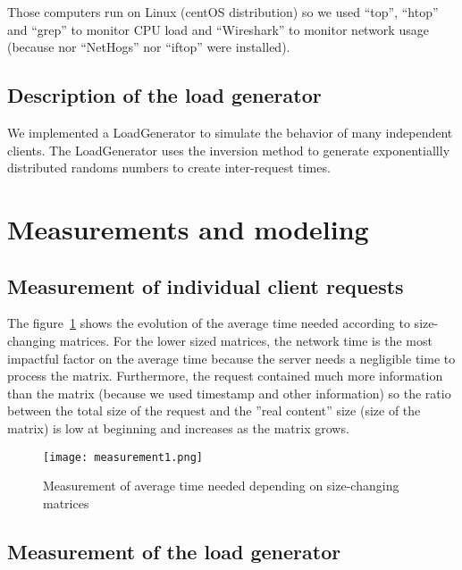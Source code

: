 Those computers run on Linux (centOS distribution) so we used \enquote{top},
\enquote{htop} and \enquote{grep} to monitor CPU load and \enquote{Wireshark}
to monitor network usage (because nor \enquote{NetHogs} nor \enquote{iftop} were
installed). \newline

\subsection{Description of the load generator}
\label{sub:Description of the load generator}
We implemented a LoadGenerator to simulate the behavior of many independent
clients. The LoadGenerator uses the inversion method to generate exponentiallly
distributed randoms numbers to create inter-request times.

\section{Measurements and modeling}
\label{sec:Measurements and modeling}

\subsection{Measurement of individual client requests}
\label{sub:Measurement of individual client requests}

The figure~\ref{fig:measurement1} shows the evolution of the average time needed
according to size-changing matrices. For the lower sized matrices, the network
time is the most impactful factor on the average time because the server needs a negligible time
to process the matrix. Furthermore, the request contained much more information than the matrix
(because we used timestamp and other information) so the ratio between the total size of the request
and the ''real content'' size (size of the matrix) is low at beginning and increases as the matrix grows.

\begin{figure}[!ht]
    \centering
    \texttt{[image: measurement1.png]}
    \caption{Measurement of average time needed depending on size-changing matrices}
    \label{fig:measurement1}
\end{figure}

\subsection{Measurement of the load generator}
\label{sub:Measurement of the load generator}

